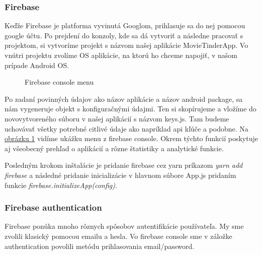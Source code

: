 \subsubsection{Firebase}
Keďže Firebase je platforma vyvinutá Googlom, prihlasuje sa do nej pomocou google účtu. Po prejdení do konzoly, kde sa dá vytvoriť a následne pracovať s projektom, si vytvoríme projekt s názvom našej aplikácie MovieTinderApp. Vo vnútri projektu zvolíme OS aplikácie, na ktorú ho chceme napojiť, v našom prípade Android OS.  
\begin{figure}[hbt!]
  \centering  
  \def\stackalignment{c}
           {\scriptsize}
	\caption{Firebase console menu}  
  \label{fireconsole}
\end{figure}
Po zadaní povinných údajov ako názov aplikácie a názov android package, sa nám  vygeneruje objekt s konfiguračnými údajmi. Ten si skopírujeme a vložíme do novovytvoreného súboru v našej aplikácií s názvom keys.js. Tam budeme uchovávať všetky potrebné citlivé údaje ako napríklad \acrshort{api} kľúče a podobne. Na \hyperref[classdiagram]{obrázku  \ref{fireconsole}} vidíme ukážku menu z firebase console. Okrem týchto funkcií poskytuje aj všeobecný prehľad o aplikácií a rôzne štatistiky a analytické funkcie. 

Posledným krokom inštalácie je pridanie firebase cez yarn príkazom \textit{yarn add firebase} a následné pridanie inicializácie v hlavnom súbore App.js pridaním funkcie \textit{firebase.initializeApp(config)}.
\subsubsection{Firebase authentication}
Firebase ponúka mnoho rôznych spôsobov autentifikácie používateľa. My sme zvolili klasický pomocou emailu a hesla. Vo firebase console sme v záložke authentication povolili metódu prihlasovania email/password. 
